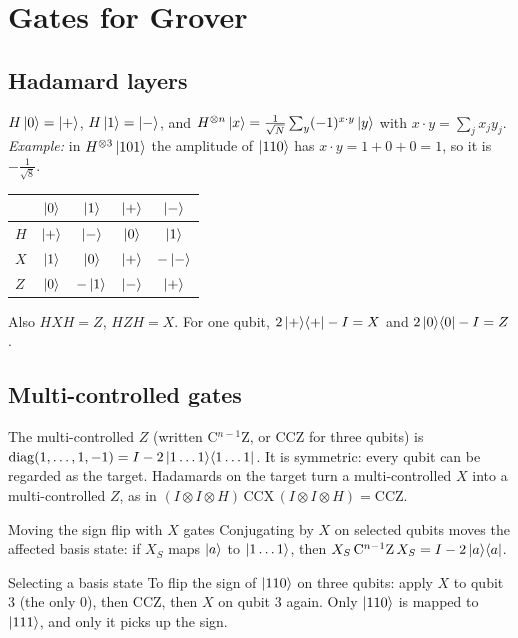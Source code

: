 \documentclass[11pt,a4paper,openany]{book}
\newcounter{wex}[section]
\newcommand{\proj}[1]{\ket{#1}\!\bra{#1}}
\begin{document}
\section{Gates for Grover}
\subsection{Hadamard layers}
$H\ket0 = \ket{+}$, $H\ket1 = \ket{-}$, and $H^{\otimes n}\ket{x} = \frac{1}{\sqrt N}\sum_y(-1)^{x\cdot y}\ket{y}$ with $x\cdot y = \sum_j x_jy_j$. \emph{Example:} in $H^{\otimes3}\ket{101}$ the amplitude of $\ket{110}$ has $x\cdot y = 1 + 0 + 0 = 1$, so it is $-\frac{1}{\sqrt8}$.

\begin{center}
\renewcommand{\arraystretch}{1.25}
\begin{tabular}{@{}l|cccc@{}}
\toprule
 & $\ket0$ & $\ket1$ & $\ket{+}$ & $\ket{-}$\\ \midrule
$H$ & $\ket{+}$ & $\ket{-}$ & $\ket0$ & $\ket1$\\
$X$ & $\ket1$ & $\ket0$ & $\ket{+}$ & $-\ket{-}$\\
$Z$ & $\ket0$ & $-\ket1$ & $\ket{-}$ & $\ket{+}$\\
\bottomrule
\end{tabular}
\end{center}
Also $HXH = Z$, $HZH = X$. For one qubit, $2\proj{+} - I = X$ and $2\proj{0} - I = Z$.

\subsection{Multi-controlled gates}
The multi-controlled $Z$ (written C$^{n-1}$Z, or CCZ for three qubits) is $\operatorname{diag}(1, \dots, 1, -1) = I - 2\proj{1\dots1}$. It is symmetric: every qubit can be regarded as the target. Hadamards on the target turn a multi-controlled $X$ into a multi-controlled $Z$, as in $(I \otimes I \otimes H)\,\mathrm{CCX}\,(I \otimes I \otimes H) = \mathrm{CCZ}$.

\begin{keyres}{Moving the sign flip with $X$ gates}
Conjugating by $X$ on selected qubits moves the affected basis state: if $X_S$ maps $\ket{a}$ to $\ket{1\dots1}$, then $X_S\,\mathrm{C}^{n-1}\mathrm{Z}\,X_S = I - 2\proj{a}$.
\end{keyres}
\begin{wexample}{Selecting a basis state}
To flip the sign of $\ket{110}$ on three qubits: apply $X$ to qubit 3 (the only $0$), then CCZ, then $X$ on qubit 3 again. Only $\ket{110}$ is mapped to $\ket{111}$, and only it picks up the sign.
\end{wexample}
\end{document}
